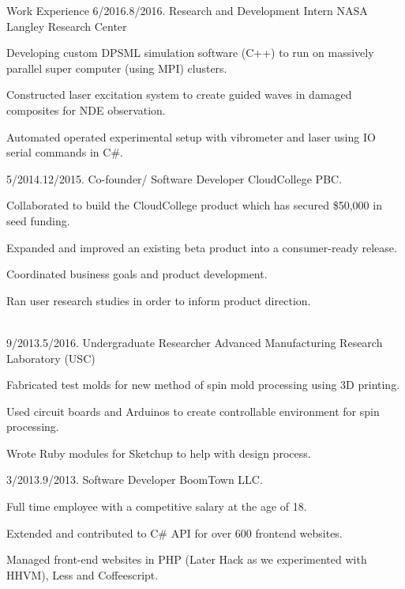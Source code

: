 \documentclass[letter,10pt]{dresume}
\begin{document}
\begin{sblock}{Work Experience}
  \experience%
    {6/2016.}{8/2016.}%
    {Research and Development Intern}%
    {NASA Langley Research Center}

      \item Developing custom DPSML simulation software (C++) to run on
        massively parallel super computer (using MPI) clusters.
      \item Constructed laser excitation system to create guided waves in
        damaged composites for NDE observation.
      \item Automated operated experimental setup with vibrometer and laser
        using IO serial commands in C\#.
  \endexperience

  \experience%
    {5/2014.}{12/2015.}%
    {Co-founder/ Software Developer}%
    {CloudCollege PBC.}

      \item Collaborated to build the CloudCollege product which has secured
        \$50,000 in seed funding.
      \item Expanded and improved an existing beta product into a consumer-ready release.
      \item Coordinated business goals and product development.
      \item Ran user research studies in order to inform product direction.
  \endexperience

  \clearpage\\

  \experience%
    {9/2013.}{5/2016.}%
    {Undergraduate Researcher}%
    {Advanced Manufacturing Research Laboratory (USC)}

      \item Fabricated test molds for new method of spin mold processing using 3D printing.
      \item Used circuit boards and Arduinos to create controllable environment
        for spin processing.
      \item Wrote Ruby modules for Sketchup to help with design process.
  \endexperience

  \experience%
    {3/2013.}{9/2013.}%
    {Software Developer}%
    {BoomTown LLC.}

    \item Full time employee with a competitive salary at the age of 18.
    \item Extended and contributed to C\# API for over 600 frontend websites.
    \item Managed front-end websites in PHP (Later Hack as we experimented with
      HHVM), Less and Coffeescript.
  \endexperience


\end{sblock}
\end{document}

